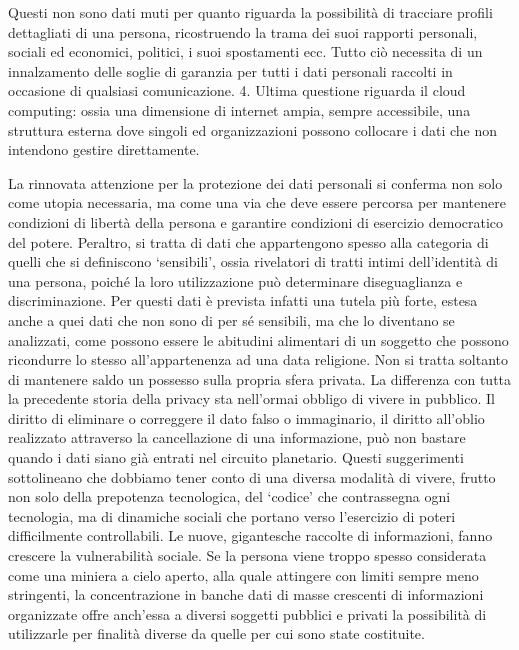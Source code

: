 Questi non sono dati muti per quanto riguarda la possibilità di tracciare profili dettagliati di una persona, ricostruendo la trama dei suoi rapporti personali, sociali ed economici, politici, i suoi spostamenti ecc. Tutto ciò necessita di un innalzamento delle soglie di garanzia per tutti i dati personali raccolti in occasione di qualsiasi comunicazione.
4.	Ultima questione riguarda il cloud computing: ossia una dimensione di internet ampia, sempre accessibile, una struttura esterna dove singoli ed organizzazioni possono collocare i dati che non intendono gestire direttamente.

La rinnovata attenzione per la protezione dei dati personali si conferma non solo come utopia necessaria, ma come una via che deve essere percorsa per mantenere condizioni di libertà della persona e garantire condizioni di esercizio democratico del potere.
Peraltro, si tratta di dati che appartengono spesso alla categoria di quelli che si definiscono ‘sensibili’, ossia rivelatori di tratti intimi dell’identità di una persona, poiché la loro utilizzazione può determinare diseguaglianza e discriminazione. Per questi dati è prevista infatti una tutela più forte, estesa anche a quei dati che non sono di per sé sensibili, ma che lo diventano se analizzati, come possono essere le abitudini alimentari di un soggetto che possono ricondurre lo stesso all’appartenenza ad una data religione.
Non si tratta soltanto di mantenere saldo un possesso sulla propria sfera privata. La differenza con tutta la precedente storia della privacy sta nell’ormai obbligo di vivere in pubblico.
Il diritto di eliminare o correggere il dato falso o immaginario, il diritto all’oblio realizzato attraverso la cancellazione di una informazione, può non bastare quando i dati siano già entrati nel circuito planetario. 
Questi suggerimenti sottolineano che dobbiamo tener conto di una diversa modalità di vivere, frutto non solo della prepotenza tecnologica, del ‘codice’ che contrassegna ogni tecnologia, ma di dinamiche sociali che portano verso l’esercizio di poteri difficilmente controllabili.
Le nuove, gigantesche raccolte di informazioni, fanno crescere la vulnerabilità sociale. Se la persona viene troppo spesso considerata come una miniera a cielo aperto, alla quale attingere con limiti sempre meno stringenti, la concentrazione in banche dati di masse crescenti di informazioni organizzate offre anch’essa a diversi soggetti pubblici e privati la possibilità di utilizzarle per finalità diverse da quelle per cui sono state costituite.


